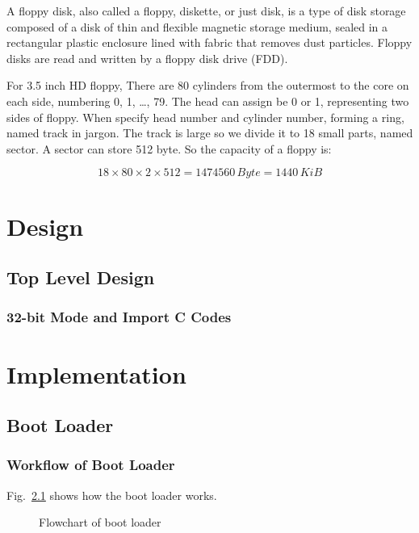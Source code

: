 \documentclass{swfcthesis}
\begin{document}
A floppy disk, also called a floppy, diskette, or just disk, is a type of disk storage
composed of a disk of thin and flexible magnetic storage medium, sealed in a rectangular
plastic enclosure lined with fabric that removes dust particles. Floppy disks are read and
written by a floppy disk drive (FDD)\cite{wiki:floppy}.

For 3.5 inch HD floppy,  There are 80 cylinders from the outermost to
the core on each side, numbering 0, 1, \ldots, 79. The head can assign be 0 or 1,
representing two sides of floppy. When specify head number and cylinder number, forming a
ring, named track in jargon. The track is large so we divide it to 18 small parts, named
sector. A sector can store 512 byte. So the capacity of a floppy is:

\[18 \times 80 \times 2 \times 512 = 1474560\,Byte = 1440\,KiB\]


\chapter{Design}

\section{Top Level Design}


\subsection{32-bit Mode and Import C Codes}

\chapter{Implementation}

\section{Boot Loader}

\subsection{Workflow of Boot Loader}

Fig.~\ref{fig:flowchart-of-boot-loader} shows how the boot loader works.

\begin{figure}[!ht]
  \centering
  \caption{Flowchart of boot loader}\label{fig:flowchart-of-boot-loader}  
\end{figure}
\end{document}
